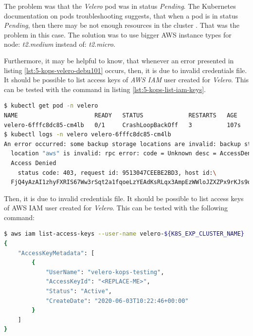 The problem was that the \textit{Velero} pod was in status \textit{Pending}. The Kubernetes documentation on pods troubleshooting suggests, that when a pod is in status \textit{Pending}, then there may be not enough resources in the cluster \cite{k8s-deb}. That was the problem in this case. The solution was to use bigger AWS instance types for node: \textit{t2.medium} instead of: \textit{t2.micro}.

Furthermore, it may be helpful to know, that whenever an error presented in listing \ref{lst:5-kops-velero-debu101} occurs, then, it is due to invalid credentials file. It should be possible to list access keys of \textit{AWS IAM} user created for \textit{Velero}. This can be tested with the command in listing \ref{lst:5-kops-list-iam-keys}.
\begin{lstlisting}[basicstyle=\scriptsize,xleftmargin=0cm,label=lst:5-kops-velero-debu101,caption={Debugging  \textit{Velero}},captionpos=b,language=Bash]
$ kubectl get pod -n velero
NAME                      READY   STATUS             RESTARTS   AGE
velero-6fffc8dc85-cm4lb   0/1     CrashLoopBackOff   3          107s
$ kubectl logs -n velero velero-6fffc8dc85-cm4lb
An error occurred: some backup storage locations are invalid: backup store for\
  location "aws" is invalid: rpc error: code = Unknown desc = AccessDenied: \
  Access Denied
	status code: 403, request id: 9513047CEEBE2BD3, host id:\
  FjQ4yAzAI1zhyFXRIS67Ww3rSqt2a1fqoeLzYEAdKsRLqx3AmpEzWWloJZXZPx9rKJs9qCH1yHY=
\end{lstlisting}
Then, it is due to invalid credentials file. It should be possible to list access keys of AWS IAM user created for \textit{Velero}. This can be tested with the following command:
\begin{lstlisting}[basicstyle=\scriptsize,xleftmargin=0cm,label=lst:5-kops-list-iam-keys,caption={Listing AWS IAM keys},captionpos=b,language=Bash]
$ aws iam list-access-keys --user-name velero-${K8S_EXP_CLUSTER_NAME}
{
    "AccessKeyMetadata": [
        {
            "UserName": "velero-kops-testing",
            "AccessKeyId": "<REPLACE-ME>",
            "Status": "Active",
            "CreateDate": "2020-06-03T10:22:46+00:00"
        }
    ]
}
\end{lstlisting}

